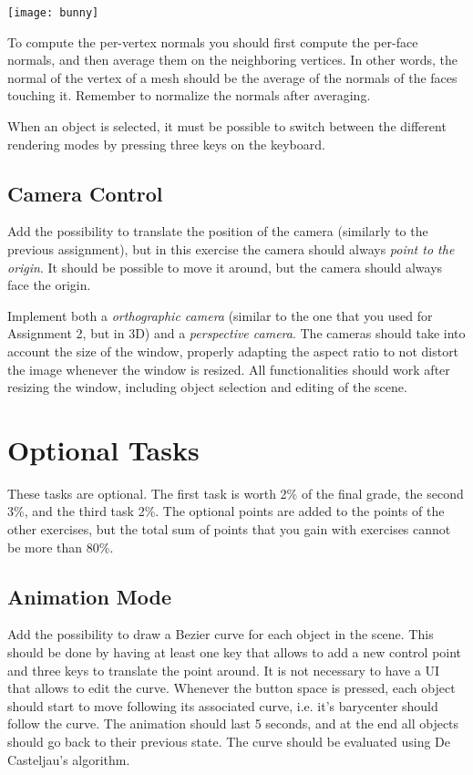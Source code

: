 \documentclass[11pt]{article}
\begin{document}
\texttt{[image: bunny]}
    
To compute the per-vertex normals you should first compute the per-face normals, and then average them on the neighboring vertices. In other words, the normal of the vertex of a mesh should be the average of the normals of the faces touching it. Remember to normalize the normals after averaging.

When an object is selected, it must be possible to switch between the different rendering modes by pressing three keys on the keyboard.

\subsection{Camera Control}

Add the possibility to translate the position of the camera (similarly to the previous assignment), but in this exercise the camera should always \emph{point to the origin}. It should be possible to move it around, but the camera should always face the origin.

Implement both a \emph{orthographic camera} (similar to the one that you used for Assignment 2, but in 3D) and a \emph{perspective camera}. The cameras should take into account the size of the window, properly adapting the aspect ratio to not distort the image whenever the window is resized. All functionalities should work after resizing the window, including object selection and editing of the scene.

\section*{Optional Tasks}

These tasks are optional. The first task is worth 2\% of the final grade, the second 3\%, and the third task 2\%. The optional points are added to the points of the other exercises, but the total sum of points that you gain with exercises cannot be more than 80\%.

\subsection{Animation Mode}

Add the possibility to draw a Bezier curve for each object in the scene. This should be done by having at least one key that allows to add a new control point and three keys to translate the point around. It is not necessary to have a UI that allows to edit the curve. Whenever the button space is pressed, each object should start to move following its associated curve, i.e. it's barycenter should follow the curve. The animation should last 5 seconds, and at the end all objects should go back to their previous state. The curve should be evaluated using De Casteljau's algorithm.
\end{document}
